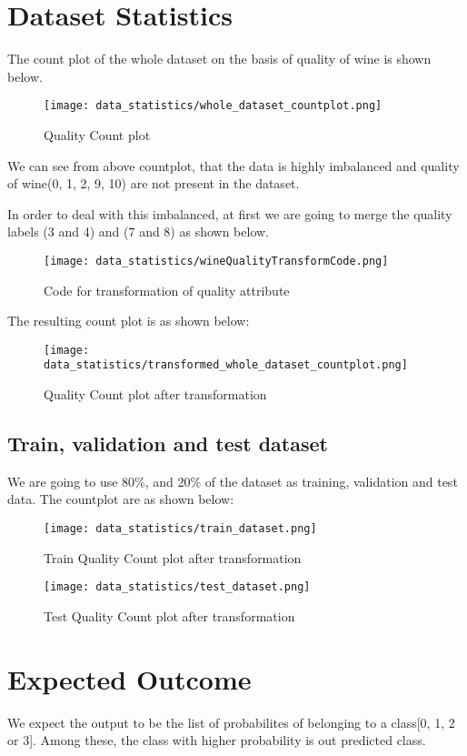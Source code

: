 \section{Dataset Statistics}
The count plot of the whole dataset on the basis of quality of wine is shown below.

\begin{figure}[H]
    \centering
    \texttt{[image: data\_statistics/whole\_dataset\_countplot.png]}
    \caption{Quality Count plot}
    \label{fig:Quality Count plot}
\end{figure}

We can see from above countplot, that the data is highly imbalanced and quality of wine(0, 1, 2, 9, 10) are not present in the dataset.

In order to deal with this imbalanced, at first we are going to merge the quality labels (3 and 4) and (7 and 8) as shown below.


\begin{figure}[H]
    \centering
    \texttt{[image: data\_statistics/wineQualityTransformCode.png]}
    \caption{Code for transformation of quality attribute}
    \label{fig:Code for transformation of quality attribute}
\end{figure}

The resulting count plot is as shown below:
\begin{figure}[H]
    \centering
    \texttt{[image: data\_statistics/transformed\_whole\_dataset\_countplot.png]}
    \caption{Quality Count plot after transformation}
    \label{fig:Quality Count plot after transformation}
\end{figure}

\subsection{Train, validation and test dataset}
We are going to use 80\%, and 20\% of the dataset as training, validation and test data. The countplot are as shown below:

\begin{figure}[H]
    \centering
    \texttt{[image: data\_statistics/train\_dataset.png]}
    \caption{Train Quality Count plot after transformation}
    \label{fig:Train Quality Count plot after transformation}
\end{figure}


\begin{figure}[H]
    \centering
    \texttt{[image: data\_statistics/test\_dataset.png]}
    \caption{Test Quality Count plot after transformation}
    \label{fig:Test Quality Count plot after transformation}
\end{figure}

\section{Expected Outcome}
We expect the output to be the list of probabilites of belonging to a class[0, 1, 2 or 3]. Among these, the class with higher probability is out predicted class.

